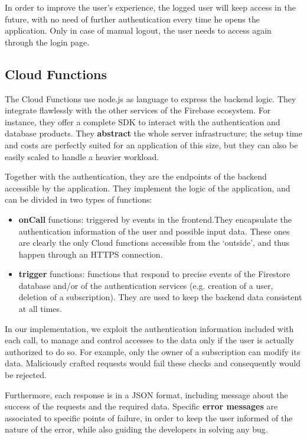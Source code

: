 \documentclass[12pt]{article}
\begin{document}
In order to improve the user's experience, the logged user will keep access in the future, with no need of further authentication every time he opens the application. Only in case of manual logout, the user needs to access again through the login page.

\subsection{Cloud Functions}
The Cloud Functions use node.js as language to express the backend logic.
They integrate flawlessly with the other services of the Firebase ecosystem. For instance, they offer a complete SDK to interact with the authentication and database products. They \textbf{abstract} the whole server infrastructure; the setup time and costs are perfectly suited for an application of this size, but they can also be easily scaled to handle a heavier workload.

Together with the authentication, they are the endpoints of the backend accessible by the application. They implement the logic of the application, and can be divided in two types of functions: \begin{itemize}
    \item \textbf{onCall} functions: triggered by events in the frontend.They encapsulate the authentication information of the user and possible input data. These ones are clearly the only Cloud functions accessible from the `outside', and thus happen through an HTTPS connection.
    \item \textbf{trigger} functions: functions that respond to precise events of the Firestore database and/or of the authentication services (e.g. creation of a user, deletion of a subscription). They are used to keep the backend data consistent at all times.
\end{itemize}

In our implementation, we exploit the authentication information included with each call, to manage and control accesses to the data only if the user is actually authorized to do so. For example, only the owner of a subscription can modify its data. Maliciously crafted requests would fail these checks and consequently would be rejected.

Furthermore, each response is in a JSON format, including message about the success of the requests and the required data. Specific \textbf{error messages} are associated to specific points of failure, in order to keep the user informed of the nature of the error, while also guiding the developers in solving any bug.
\end{document}

